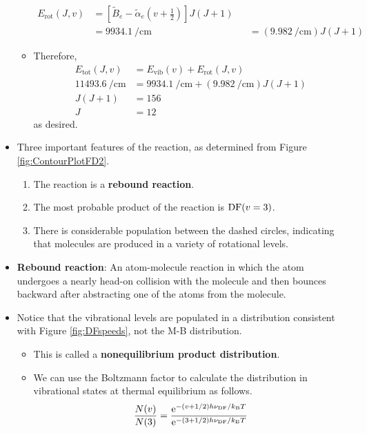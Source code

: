 \documentclass[../notes.tex]{subfiles}
\begin{document}
\begin{itemize}
\begin{itemize}
\begin{align*}
                E_\text{rot}(J,v) &= \left[ \tilde{B}_e-\tilde{\alpha}_e\left( v+\tfrac{1}{2} \right) \right]J(J+1)\\
            &= \SI{9934.1}{\per\centi\meter}&
                &= (\SI{9.982}{\per\centi\meter})J(J+1)
        \end{align*}
        \item Therefore,
        \begin{align*}
            E_\text{tot}(J,v) &= E_\text{vib}(v)+E_\text{rot}(J,v)\\
            \SI{11493.6}{\per\centi\meter} &= \SI{9934.1}{\per\centi\meter}+(\SI{9.982}{\per\centi\meter})J(J+1)\\
            J(J+1) &= 156\\
            J &= 12
        \end{align*}
        as desired.
    \end{itemize}
    \item Three important features of the  reaction, as determined from Figure \ref{fig:ContourPlotFD2}.
    \begin{enumerate}
        \item The reaction is a \textbf{rebound reaction}.
        \item The most probable product of the reaction is $\ce{DF}(v=3)$.
        \item There is considerable population between the dashed circles, indicating that  molecules are produced in a variety of rotational levels.
    \end{enumerate}
    \item \textbf{Rebound reaction}: An atom-molecule reaction in which the atom undergoes a nearly head-on collision with the molecule and then bounces backward after abstracting one of the atoms from the molecule.
    \item Notice that the vibrational levels are populated in a distribution consistent with Figure \ref{fig:DFspeeds}, not the M-B distribution.
    \begin{itemize}
        \item This is called a \textbf{nonequilibrium product distribution}.
        \item We can use the Boltzmann factor to calculate the distribution in  vibrational states at thermal equilibrium as follows.
        \begin{equation*}
            \frac{N(v)}{N(3)} = \frac{\e[-(v+1/2)h\nu_{\ce{DF}}/\kB T]}{\e[-(3+1/2)h\nu_{\ce{DF}}/\kB T]}

\end{equation*}
\end{itemize}
\end{itemize}
\end{document}
